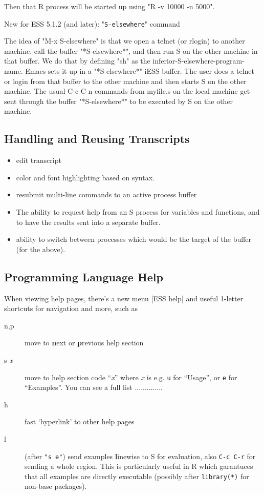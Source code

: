 \documentclass{article}
\begin{document}
Then that R process will be started up using "R -v 10000 -n 5000".


New for ESS 5.1.2 (and later):  "\texttt{S-elsewhere}" command

  The idea of "M-x S-elsewhere" is that we open a telnet (or rlogin)
  to another machine, call the buffer "*S-elsewhere*", and then run S
  on the other machine in that buffer.  We do that by defining "sh" as
  the inferior-S-elsewhere-program-name.  Emacs sets it up in a
  "*S-elsewhere*" iESS buffer.  The user does a telnet or login from
  that buffer to the other machine and then starts S on the other
  machine.  The usual C-c C-n commands from myfile.s on the local
  machine get sent through the buffer "*S-elsewhere*" to be executed
  by S on the other machine.
                           

\subsection{Handling and Reusing Transcripts}
\label{sec:S:trans}

\begin{itemize}
\item  edit transcript 
\item  color and font highlighting based on syntax. 
\item  resubmit multi-line commands to an active process buffer 
\item  The ability to request help from an S process for variables and 
        functions, and to have the results sent into a separate buffer. 
\item  ability to switch between processes which would be the target of the  
  buffer (for the above). 
\end{itemize}

\subsection{Programming Language Help}
\label{sec:S:help}
When viewing help pages, there's a new menu \textsf{[ESS help]} and
useful 1-letter shortcuts for navigation and more, such as
\begin{description}
\item[n,p] move to \textbf{n}ext or \textbf{p}revious help section
\item[s \textit{x}] move to help section code ``\textit{x}'' where
  \textit{x} is e.g. \texttt{u} for ``Usage'', or \texttt{e} for
  ``Examples''.  You can see a full list ..............

\item[h] fast `hyperlink' to other help pages

\item[l] (after \texttt{"s e"}) send examples \textbf{l}inewise to S for
  evaluation, also \texttt{C-c C-r} for sending a whole region.  This 
  is particularly useful in R which garantuees that all examples are
  directly executable (possibly after \texttt{library(*)} for non-base
  packages).
\end{description}
\end{document}
